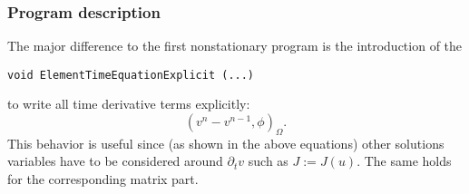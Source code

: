\subsubsection{Program description}

The major difference to the first nonstationary program
is the introduction of the 
\begin{verbatim}
void ElementTimeEquationExplicit (...) 
\end{verbatim}
to write all time derivative terms explicitly:
\begin{equation*}
(v^n - v^{n-1}, \phi)_{\Omega}.
\end{equation*}
This behavior is useful since (as shown in the above equations)
other solutions variables have to be considered
around $\partial_t v$ such as $J:=J(u)$. 
The same holds for the corresponding matrix part.


\vspace{0.2cm}
